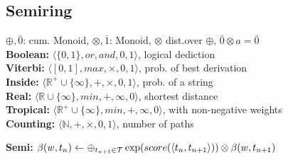 \subsection{Semiring}
$\oplus, \bar{0}$: cum. Monoid, $\otimes, \bar{1}$: Monoid, $\otimes$ dist.over $\oplus$, $\bar{0}\otimes a = \bar{0}$\\
\textbf{Boolean:} $\langle \{ 0,1 \}, or, and, 0, 1 \rangle$, logical dediction\\
\textbf{Viterbi:} $\langle [ 0,1 ], max, \times, 0, 1 \rangle$, prob. of best derivation\\
\textbf{Inside:} $\langle \mathbb{R}^+ \cup \{ \infty \}, +, \times, 0, 1 \rangle$, prob. of a string\\
\textbf{Real:} $\langle \mathbb{R} \cup \{ \infty \}, min, +, \infty, 0 \rangle$, shortest distance\\
\textbf{Tropical:} $\langle \mathbb{R}^+ \cup \{ \infty \}, min, +, \infty, 0 \rangle$,  with non-negative weights\\
\textbf{Counting:} $\langle \mathbb{N}, +, \times, 0, 1 \rangle$, number of paths\\
\begin{comment}
	$\oplus, \bar{0}$: cum. Monoid: Monoid and a $\oplus$ b = b $\oplus$ a \\
	$\otimes, \bar{1}$: Monoid: (a $\otimes$ b) $\otimes$ c = a $\otimes$ (b $\otimes$ c), $\bar{1} \otimes a = a$\\
	$\otimes$ dist.over $\oplus$: $(a \oplus b) \otimes c = (a \otimes c) \oplus (b \otimes c)$, also w/ c in front. \\
	$\bar{0}\otimes a = \bar{0}$: The identity element of plus must annihilate in the times relation\\
\end{comment} 

\textbf{Semi:} $\beta(w, t_n) \leftarrow \oplus_{t_{n+1} \in \mathcal{T}} \exp (score(\langle t_{n}, t_{n+1} \rangle)) \otimes \beta(w, t_{n+1})$\\
\begin{comment}
	All shortest path algorithms with this dynamic program structure (using a semiring) are correct, since we proofed it for all semi-rings.\\
\end{comment} 




